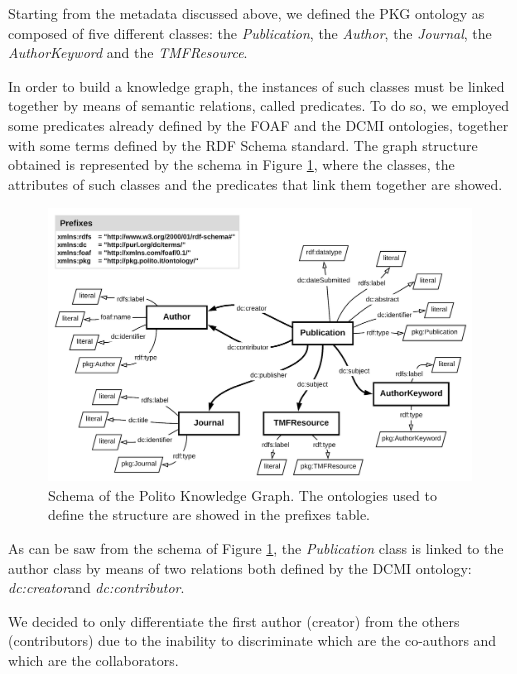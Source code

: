 \documentclass[%
    corpo=13.5pt,
    twoside,
    oldstyle,
    tipotesi=magistrale,
    greek,
    evenboxes
]{toptesi}
\begin{document}
Starting from the metadata discussed above, we defined
the PKG ontology as composed of five different classes:
the \emph{Publication}, the \emph{Author}, the \emph{Journal}, the
\emph{AuthorKeyword} and the \emph{TMFResource}.

In order to build a knowledge graph, the instances of such classes must be
linked together by means of semantic relations, called predicates.
To do so, we employed some predicates already defined by the
FOAF\cite{brickley2007} and the DCMI\cite{weibel1998} ontologies, together with
some terms defined by the RDF Schema standard.
The graph structure obtained is represented by the schema in
Figure \ref{fig:schema}, where the classes, the attributes of such classes and
the predicates that link them together are showed.

\begin{figure}[h]
    \centering
    \includegraphics[scale=0.20]{img/schema.png}
    \caption{Schema of the Polito Knowledge Graph. The ontologies used to
    define the structure are showed in the prefixes table.}
    \label{fig:schema}
\end{figure}

As can be saw from the schema of Figure \ref{fig:schema}, the \emph{Publication}
class is linked to the author class by means of two relations both defined by
the DCMI ontology:
\emph{dc:creator}\footnotemark and \emph{dc:contributor}\footnotemark[\value{footnote}].

We decided to only differentiate the first author (creator) from
the others (contributors) due to the inability to discriminate which are the
co-authors and which are the collaborators.
\end{document}
